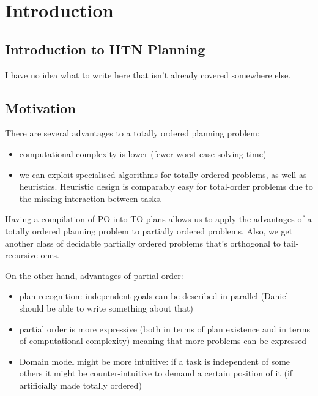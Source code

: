 \chapter{Introduction}

\section{Introduction to HTN Planning}
I have no idea what to write here that isn't already covered somewhere else.

\section{Motivation}
There are several advantages to a totally ordered planning problem:
    \begin{itemize}
   		\item computational complexity is lower (fewer worst-case solving time)
        \item we can exploit specialised algorithms for totally ordered problems, as well as heuristics. Heuristic design is comparably easy for total-order problems due to the missing interaction between tasks.
   	\end{itemize}

Having a compilation of PO into TO plans allows us to apply the advantages of a totally ordered planning problem to partially ordered problems. Also, we get another class of decidable partially ordered problems that's orthogonal to tail-recursive ones. %

On the other hand, advantages of partial order:
\begin{itemize}
	\item plan recognition: independent goals can be described in parallel (Daniel should be able to write something about that)
	\item partial order is more expressive (both in terms of plan existence and in terms of computational complexity) meaning that more problems can be expressed
	\item Domain model might be more intuitive: if a task is independent of some others it might be counter-intuitive to demand a certain position of it (if artificially made totally ordered)
\end{itemize}

